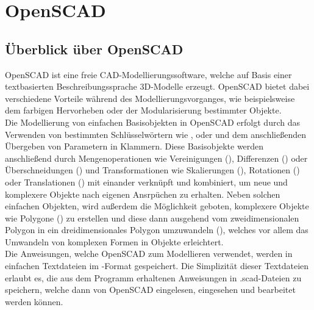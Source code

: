 \section{OpenSCAD}
\subsection{Überblick über OpenSCAD}
OpenSCAD ist eine freie CAD-Modellierungssoftware, welche auf Basis einer textbasierten Beschreibungssprache 3D-Modelle erzeugt.
OpenSCAD bietet dabei verschiedene Vorteile während des Modellierungsvorganges, wie beispielsweise dem farbigen Hervorheben oder der Modularisierung bestimmter Objekte. \\
Die Modellierung von einfachen Basisobjekten in OpenSCAD erfolgt durch das Verwenden von bestimmten Schlüsselwörtern wie ,  oder  und dem anschließenden Übergeben von Parametern in Klammern.
Diese Basisobjekte werden anschließend durch Mengenoperationen wie Vereinigungen (), Differenzen () oder Überschneidungen () und Transformationen wie Skalierungen (), Rotationen () oder Translationen () mit einander verknüpft und kombiniert, um neue und komplexere Objekte nach eigenen Ansrpüchen zu erhalten.
Neben solchen einfachen Objekten, wird außerdem die Möglichkeit geboten, komplexere Objekte wie Polygone () zu erstellen und diese dann ausgehend vom zweidimensionalen Polygon in ein dreidimensionales Polygon umzuwandeln (), welches vor allem das Umwandeln von komplexen Formen in Objekte erleichtert. \\
Die Anweisungen, welche OpenSCAD zum Modellieren verwendet, werden in einfachen Textdateien im -Format gespeichert.
Die Simplizität dieser Textdateien erlaubt es, die aus dem Programm erhaltenen Anweisungen in .scad-Dateien zu speichern, welche dann von OpenSCAD eingelesen, eingesehen und bearbeitet werden können.
